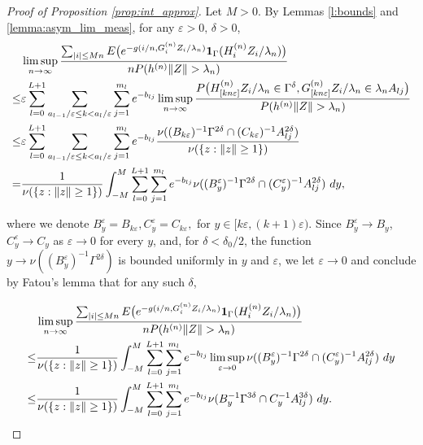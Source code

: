 \documentclass[11pt,reqno]{amsart}
\numberwithin{equation}{section}
\theoremstyle{definition}
\theoremstyle{remark}
\theoremstyle{definition}
\newcommand{\eps}{\varepsilon}
\newcommand{\one}{{\bf 1}}
\begin{document}
\begin{proof}[Proof of Proposition \ref{prop:int_approx}]
Let $M>0$.  By Lemmas \ref{l:bounds} and \ref{lemma:asym_lim_meas},
for any $\eps>0, \, \delta>0$, 
\begin{align*}%
    & \limsup_{n\to\infty}  \frac{\sum_{|i|\leq Mn} E\bigl( e^{-g(i/n,
    G_i^{(n)} Z_i /\lambda_n)} \one_{\Gamma}(H_i^{(n)} Z_i/\lambda_n)\bigr) }
{n P(h^{(n)}\|Z\| > \lambda_n)}\\
\leq&\eps\sum_{l=0}^{L+1} \sum_{a_{l-1}/\eps\leq
                 k<a_l/\eps} \sum_{j=1}^{m_l} e^{-b_{lj}} \limsup_{n\to\infty}  \frac{ P\bigl(
                 H_{[kn\eps]}^{(n)}Z_i/\lambda_n \in 
                 \Gamma^\delta, G_{[kn\eps]}^{(n)} Z_i /\lambda_n \in \lambda_n A_{lj} \bigr)}
{P(h^{(n)}\|Z\| > \lambda_n)}\\
\leq& \eps\sum_{l=0}^{L+1} \sum_{a_{l-1}/\eps\leq
                 k<a_l/\eps} \sum_{j=1}^{m_l} e^{-b_{lj}}
\frac{\nu((B_{k\eps})^{-1} \Gamma^{2\delta} \cap (C_{k\eps})^{-1} A_{lj}^{2\delta})}{\nu(\{z: \|z\| \geq
      1\})} \\
=& 
\frac{1}{\nu(\{z: \|z\|\geq 1\})}
\int_{-M}^M \sum_{l=0}^{L+1}  \sum_{j=1}^{m_l} e^{-b_{lj}}\nu((B_{y}^{\eps})^{
      -1}\Gamma^{2\delta} \cap (C_y^{\eps})^{-1} A_{lj}^{2\delta}) \ dy,  
\end{align*}


where we denote $B_{y}^{\eps} = B_{k\eps},
C_y^{\eps} = C_{k\eps},$ for $ y\in [k\eps,
(k+1)\eps)$. Since $B_{y}^{\eps}\to B_y$, $C_y^{\eps}\to C_y$ as $\eps\to 0$ for every $y$,
and, for $\delta<\delta_0/2$,  the function $y\to \nu((B_{y}^{\eps})^{
      -1}\Gamma^{2\delta})$ is bounded uniformly in $y$ and $\eps$, we
    let $\eps\to 0$ and     conclude by Fatou's lemma that for any
    such $\delta$, 

    
    \begin{align*}
&  \limsup_{n\to\infty}  \frac{\sum_{|i|\leq Mn} E\bigl( e^{-g(i/n,
    G_i^{(n)}Z_i/\lambda_n)} \one_{\Gamma}(H_i^{(n)} Z_i/\lambda_n)\bigr) }
                     {n P(h^{(n)}\|Z\| > \lambda_n)}\\
\leq& \frac{1}{\nu(\{z: \|z\|\geq 1\})}
\int_{-M}^M \sum_{l=0}^{L+1}  \sum_{j=1}^{m_l}
      e^{-b_{lj}}\limsup_{\eps\to 0}\nu((B_{y}^{\eps})^{
      -1}\Gamma^{2\delta} \cap (C_y^{\eps})^{-1} A_{lj}^{2\delta}) \ dy
      \\
   \leq&   \frac{1}{\nu(\{z: \|z\|\geq 1\})}
\int_{-M}^M \sum_{l=0}^{L+1}  \sum_{j=1}^{m_l}
      e^{-b_{lj}} \nu(B_{y}^{
      -1}\Gamma^{3\delta} \cap C_y^{-1} A_{lj}^{3\delta}) \ dy.
    \end{align*}
 


\end{proof}
\end{document}
